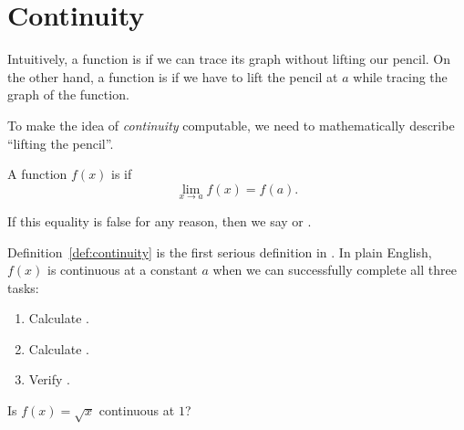 \documentclass[../main.tex]{subfiles}
\begin{document}
 \section{Continuity}
Intuitively, a function is  if we can trace its graph without lifting our pencil. On the other hand, a function is  if we have to lift the pencil at \(a\) while tracing the graph of the function.

\begin{center}
  
  \qquad
  
  
  
\end{center}

To make the idea of \emph{continuity} computable, we need to mathematically describe \enquote{lifting the pencil}.

\begin{definition}[continuity] \label{def:continuity}
  A function \(f(x)\) is  if
  \[
    {\lim_{x \to a} f(x) = f(a).}
  \]

  If this equality is false for any reason, then we say  or .

\end{definition}

Definition~\ref{def:continuity} is the first serious definition in \thiscourse{}. In plain English, \(f(x)\) is continuous at a constant \(a\) when we can successfully complete all three tasks:

\begin{sidefigure}{}
  \begin{enumerate}[label=(C\arabic*), itemsep={2ex}]
    \item Calculate \underline{\hspace{3in}}.
    \item Calculate \underline{\hspace{3in}}.
    \item Verify \underline{\hspace{3.23in}}.
  \end{enumerate}

  \begin{example} \label{eg:continuity-intro}
    Is \(f(x) = \sqrt{x}\) continuous at \(1\)?

  \end{example}
\end{sidefigure}
\clearpage
\end{document}
